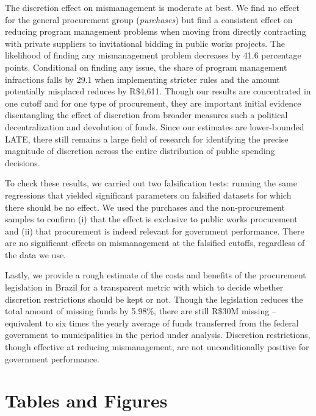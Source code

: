 \documentclass[11pt]{article}
\begin{document}
The discretion effect on mismanagement is moderate at best. We find no effect for the general procurement group (\emph{purchases}) but find a consistent effect on reducing program management problems when moving from directly contracting with private suppliers to invitational bidding in public works projects. The likelihood of finding any mismanagement problem decreases by 41.6 percentage points. Conditional on finding any issue, the share of program management infractions falls by 29.1 when implementing stricter rules and the amount potentially misplaced reduces by R\$4,611. Though our results are concentrated in one cutoff and for one type of procurement, they are important initial evidence disentangling the effect of discretion from broader measures such a political decentralization and devolution of funds. Since our estimates are lower-bounded LATE, there still remains a large field of research for identifying the precise magnitude of discretion across the entire distribution of public spending decisions.

To check these results, we carried out two falsification tests: running the same regressions that yielded significant parameters on falsified datasets for which there should be no effect. We used the purchases and the non-procurement samples to confirm (i) that the effect is exclusive to public works procurement and (ii) that procurement is indeed relevant for government performance. There are no significant effects on mismanagement at the falsified cutoffs, regardless of the data we use.

Lastly, we provide a rough estimate of the costs and benefits of the procurement legislation in Brazil for a transparent metric with which to decide whether discretion restrictions should be kept or not. Though the legislation reduces the total amount of missing funds by 5.98\%, there are still R\$30M missing -- equivalent to six times the yearly average of funds transferred from the federal government to municipalities in the period under analysis. Discretion restrictions, though effective at reducing mismanagement, are not unconditionally positive for government performance.

\pagebreak

\setlength\bibsep{0pt}



\pagebreak

\section*{Tables and Figures} \label{sec:tables}
\end{document}

